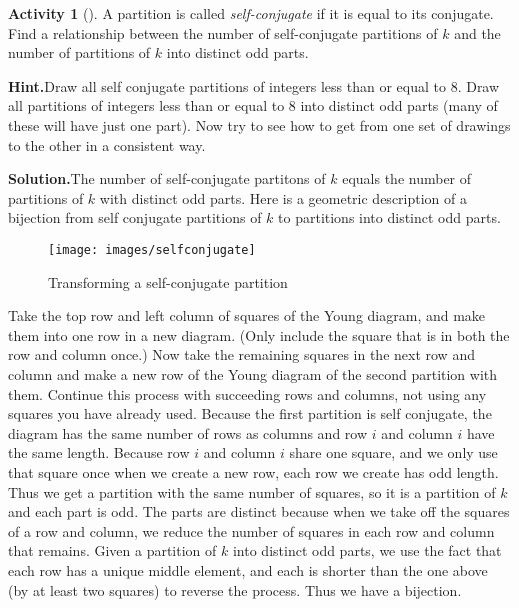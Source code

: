 \documentclass[10pt,]{book}
\theoremstyle{plain}
\theoremstyle{definition}
\newtheorem{activity}[project]{Activity}
\numberwithin{equation}{chapter}
\begin{document}
\begin{activity}[]\label{activity-153}
A partition is called \emph{self-conjugate} if it is equal to its conjugate. Find a relationship between the number of self-conjugate partitions of \(k\) and the number of partitions of \(k\) into distinct odd parts.%
\par\medskip\noindent%
\textbf{Hint.}\quad Draw all self conjugate partitions of integers less than or equal to 8.  Draw all partitions of integers less than or equal to 8 into distinct odd parts (many of these will have just one part). Now try to see how to get from one set of drawings to the other in a consistent way.%
\par\medskip\noindent%
\textbf{Solution.}\quad The number of self-conjugate partitons of \(k\) equals the number of partitions of \(k\) with distinct odd parts. Here is a geometric description of a bijection from self conjugate partitions of \(k\) to partitions into distinct odd parts.%
\begin{figure}
\centering
\texttt{[image: images/selfconjugate]}
\caption{Transforming a self-conjugate partition\label{selfconjugate-to-distinctodd}}
\end{figure}
Take the top row and left column of squares of the Young diagram, and make them into one row in a new diagram. (Only include the square that is in both the row and column once.) Now take the remaining squares in the next row and column and make a new row of the Young diagram of the second partition with them. Continue this process with succeeding rows and columns, not using any squares you have already used. Because the first partition is self conjugate, the diagram has the same number of rows as columns and row \(i\) and column \(i\) have the same length. Because row \(i\) and column \(i\) share one square, and we only use that square once when we create a new row, each row we create has odd length. Thus we get a partition with the same number of squares, so it is a partition of \(k\) and each part is odd. The parts are distinct because when we take off the squares of a row and column, we reduce the number of squares in each row and column that remains. Given a partition of \(k\) into distinct odd parts, we use the fact that each row has a unique middle element, and each is shorter than the one above (by at least two squares) to reverse the process. Thus we have a bijection.%
\end{activity}
\end{document}
